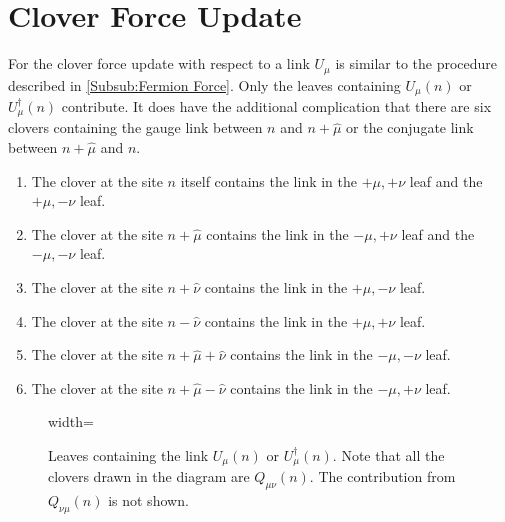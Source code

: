 \section{Clover Force Update}
	For the clover force update with respect to a link $U_\mu$ is similar to the procedure described in 
	\cref{Subsub:Fermion Force}. Only the leaves containing $U_\mu(n)$ or $U^\dagger_{\mu}(n)$
	contribute. It does have the additional complication that there are six clovers containing the gauge link between $n$
	and $n+\hat{\mu}$ or the conjugate link between $n+\hat{\mu}$ and $n$.
	\begin{enumerate}
		\item The clover at the site $n$ itself contains the link in the $+\mu,+\nu$ leaf and the $+\mu,-\nu$ leaf.
		\item The clover at the site $n+\hat{\mu}$ contains the link in the $-\mu,+\nu$ leaf and the $-\mu,-\nu$ leaf.
		\item The clover at the site $n+\hat{\nu}$ contains the link in the $+\mu,-\nu$ leaf.
		\item The clover at the site $n-\hat{\nu}$ contains the link in the $+\mu,+\nu$ leaf.
		\item The clover at the site $n+\hat{\mu}+\hat{\nu}$ contains the link in the $-\mu,-\nu$ leaf.
		\item The clover at the site $n+\hat{\mu}-\hat{\nu}$ contains the link in the $-\mu,+\nu$ leaf.
	\end{enumerate}
	\begin{figure}
		\centring
		\begin{adjustbox}{width=\linewidth}
		\end{adjustbox}
		\captionsetup{width=\linewidth}
		\caption{Leaves containing the link $U_\mu(n)$ or $U^\dagger_{\mu}(n)$. Note that all the
		clovers drawn in the diagram are $Q_{\mu\nu}(n)$. The contribution from $Q_{\nu\mu}(n)$ is not shown.}
		\label{Tikz:Clover_Force}
	\end{figure}

